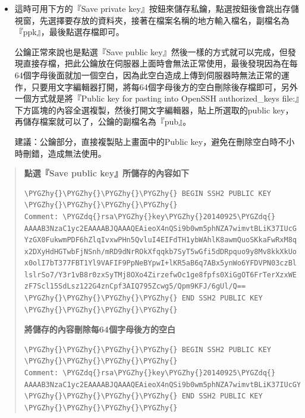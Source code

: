 \documentclass[letterpaper,10pt,english]{sphinxmanual}
\def\PYGZhy{\char`\-}
\def\PYGZdq{\char`\"}
\begin{document}
\begin{itemize}
\item {} 
這時可用下方的『Save private key』按鈕來儲存私鑰，點選按鈕後會跳出存儲視窗，先選擇要存放的資料夾，接著在檔案名稱的地方輸入檔名，副檔名為『ppk』，最後點選存檔即可。

公鑰正常來說也是點選『Save public key』然後一樣的方式就可以完成，但發現直接存檔，把此公鑰放在伺服器上面時會無法正常使用，最後發現因為在每64個字母後面就加一個空白，因為此空白造成上傳到伺服器時無法正常的運作，只要用文字編輯器打開，將每64個字母後方的空白刪除後存檔即可，另外一個方式就是將『Public key for pasting into OpenSSH authorized\_keys file:』下方區塊的內容全選複製，然後打開文字編輯器，貼上所選取的public key，再儲存檔案就可以了，公鑰的副檔名為『pub』。

建議：公鑰部分，直接複製貼上畫面中的Public key，避免在刪除空白時不小時刪錯，造成無法使用。

\end{itemize}
\begin{quote}

\textbf{點選『Save public key』所儲存的內容如下}

\begin{Verbatim}[commandchars=\\\{\}]
\PYGZhy{}\PYGZhy{}\PYGZhy{}\PYGZhy{} BEGIN SSH2 PUBLIC KEY \PYGZhy{}\PYGZhy{}\PYGZhy{}\PYGZhy{}
Comment: \PYGZdq{}rsa\PYGZhy{}key\PYGZhy{}20140925\PYGZdq{}
AAAAB3NzaC1yc2EAAAABJQAAAQEAieoX4nQSi9b0wm5phNZA7wimvtBLiK37IUcG
YzGX0FukwmPDF6hZlqIvxwPHn5QvluI4EIFdTH1ybWAhlK8awmQuoSKkaFwRxM8q
x2DXyHdHGTwbFjNSnh/mRD9dNrROkXfqqkb7SyT5wGfi5dDRpquo9y8Mv8kkXkUo
x0olI7bT377FBT1Yl9VAFIF9PpNeBYpwI+lKR5aB6q7ABx5ynWo6YFDVPN03czBl
lslrSo7/Y3r1vB8r0zxSyTMj8OXo4ZirzefwOc1ge8fpfs0XiGgOT6FrTerXzxWE
zF7Scl15SdLsz122G4znCpf3AIQ795Zcwg5/Qpm9KFJ/6gUl/Q==
\PYGZhy{}\PYGZhy{}\PYGZhy{}\PYGZhy{} END SSH2 PUBLIC KEY \PYGZhy{}\PYGZhy{}\PYGZhy{}\PYGZhy{}
\end{Verbatim}

\textbf{將儲存的內容刪除每64個字母後方的空白}

\begin{Verbatim}[commandchars=\\\{\}]
\PYGZhy{}\PYGZhy{}\PYGZhy{}\PYGZhy{} BEGIN SSH2 PUBLIC KEY \PYGZhy{}\PYGZhy{}\PYGZhy{}\PYGZhy{}
Comment: \PYGZdq{}rsa\PYGZhy{}key\PYGZhy{}20140925\PYGZdq{}
AAAAB3NzaC1yc2EAAAABJQAAAQEAieoX4nQSi9b0wm5phNZA7wimvtBLiK37IUcGYzGX0FukwmPDF6hZlqIvxwPHn5QvluI4EIFdTH1ybWAhlK8awmQuoSKkaFwRxM8qx2DXyHdHGTwbFjNSnh/mRD9dNrROkXfqqkb7SyT5wGfi5dDRpquo9y8Mv8kkXkUox0olI7bT377FBT1Yl9VAFIF9PpNeBYpwI+lKR5aB6q7ABx5ynWo6YFDVPN03czBllslrSo7/Y3r1vB8r0zxSyTMj8OXo4ZirzefwOc1ge8fpfs0XiGgOT6FrTerXzxWEzF7Scl15SdLsz122G4znCpf3AIQ795Zcwg5/Qpm9KFJ/6gUl/Q==
\PYGZhy{}\PYGZhy{}\PYGZhy{}\PYGZhy{} END SSH2 PUBLIC KEY \PYGZhy{}\PYGZhy{}\PYGZhy{}\PYGZhy{}
\end{Verbatim}
\end{quote}
\end{document}
